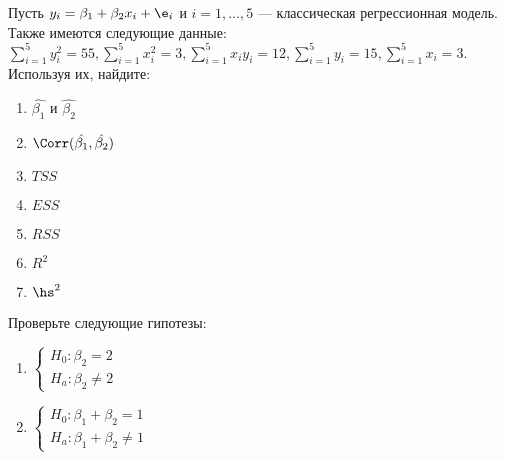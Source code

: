 \documentclass[pdftex,11pt,openany]{book}\usepackage[]{graphicx}\usepackage[]{color}
\begin{document}
\begin{problem}
 Пусть $y_i = \beta_1 + \beta_2 x_i + \e_i$ и $i = 1, \dots, 5$ --- классическая регрессионная модель. Также имеются следующие данные: $\sum_{i=1}^5 y_i^2 = 55, \sum_{i=1}^5 x_i^2 = 3, \sum_{i=1}^5 x_iy_i = 12, \sum_{i=1}^5 y_i = 15, \sum_{i=1}^5 x_i = 3.$ Используя их, найдите:

\begin{enumerate}
\item $\hat{\beta_1}$ и $\hat{\beta_2}$
\item $\Corr(\hat{\beta_1}, \hat{\beta_2})$
\item $TSS$
\item $ESS$
\item $RSS$
\item $R^2$
\item $\hs^2$
\end{enumerate}

Проверьте следующие гипотезы:
\begin{enumerate}
\item $\begin{cases}  H_0: \beta_2 = 2  \\ H_a: \beta_2 \not= 2 \end{cases}$
\item $\begin{cases}  H_0: \beta_1 + \beta_2 = 1  \\ H_a: \beta_1 + \beta_2 \not= 1 \end{cases}$
\end{enumerate}
\end{problem}

\begin{solution}
\end{solution}
\end{document}
